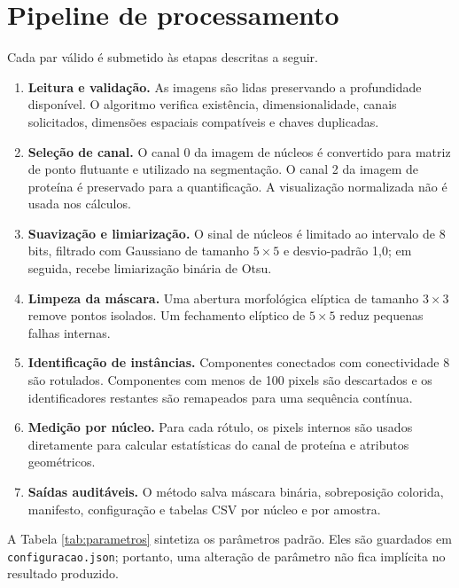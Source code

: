 \section{Pipeline de processamento}
\label{sec:pipeline}

Cada par válido é submetido às etapas descritas a seguir.

\begin{enumerate}
    \item \textbf{Leitura e validação.} As imagens são lidas preservando a profundidade disponível. O algoritmo verifica existência, dimensionalidade, canais solicitados, dimensões espaciais compatíveis e chaves duplicadas.
    \item \textbf{Seleção de canal.} O canal 0 da imagem de núcleos é convertido para matriz de ponto flutuante e utilizado na segmentação. O canal 2 da imagem de proteína é preservado para a quantificação. A visualização normalizada não é usada nos cálculos.
    \item \textbf{Suavização e limiarização.} O sinal de núcleos é limitado ao intervalo de 8 bits, filtrado com Gaussiano de tamanho $5 \times 5$ e desvio-padrão 1,0; em seguida, recebe limiarização binária de Otsu.
    \item \textbf{Limpeza da máscara.} Uma abertura morfológica elíptica de tamanho $3 \times 3$ remove pontos isolados. Um fechamento elíptico de $5 \times 5$ reduz pequenas falhas internas.
    \item \textbf{Identificação de instâncias.} Componentes conectados com conectividade 8 são rotulados. Componentes com menos de 100 pixels são descartados e os identificadores restantes são remapeados para uma sequência contínua.
    \item \textbf{Medição por núcleo.} Para cada rótulo, os pixels internos são usados diretamente para calcular estatísticas do canal de proteína e atributos geométricos.
    \item \textbf{Saídas auditáveis.} O método salva máscara binária, sobreposição colorida, manifesto, configuração e tabelas CSV por núcleo e por amostra.
\end{enumerate}

A Tabela \ref{tab:parametros} sintetiza os parâmetros padrão. Eles são guardados em \texttt{configuracao.json}; portanto, uma alteração de parâmetro não fica implícita no resultado produzido.

